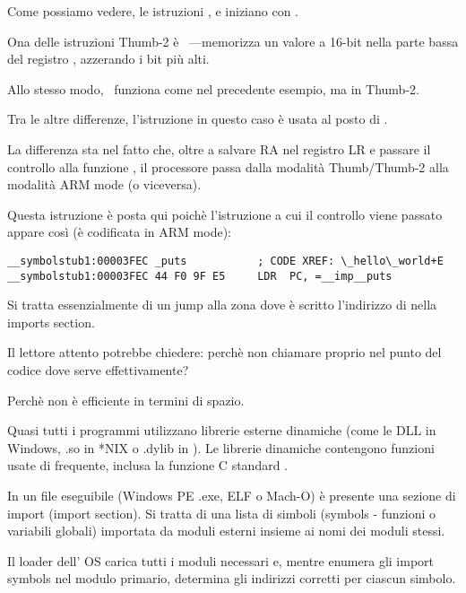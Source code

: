 
Come possiamo vedere, le istruzioni ,  e  iniziano con .

Ona delle istruzioni Thumb-2 è  ~---memorizza un valore a 16-bit nella parte bassa del registro  ,
azzerando i bit più alti.

Allo stesso modo,  ~funziona come  nel precedente esempio, ma in Thumb-2.


Tra le altre differenze, l'istruzione  in questo caso è usata al posto di .

La differenza sta nel fatto che, oltre a salvare \ac{RA} nel registro \ac{LR} e passare il controllo alla funzione \puts,
il processore passa dalla modalità Thumb/Thumb-2 alla modalità ARM mode (o viceversa).

Questa istruzione è posta qui poichè l'istruzione a cui il controllo viene passato appare così (è codificata in ARM mode):

\begin{lstlisting}[style=customasmARM]
__symbolstub1:00003FEC _puts           ; CODE XREF: \_hello\_world+E
__symbolstub1:00003FEC 44 F0 9F E5     LDR  PC, =__imp__puts
\end{lstlisting}

Si tratta essenzialmente di un jump alla zona dove è scritto l'indirizzo di \puts nella imports section.

Il lettore attento potrebbe chiedere: perchè non chiamare \puts proprio nel punto del codice dove serve effettivamente?

Perchè non è efficiente in termini di spazio.

Quasi tutti i programmi utilizzano librerie esterne dinamiche (come le DLL in Windows, .so in *NIX o .dylib in \MacOSX).
Le librerie dinamiche contengono funzioni usate di frequente, inclusa la funzione C standard \puts.

In un file eseguibile (Windows PE .exe, ELF o Mach-O) è presente una sezione di import (import section).
Si tratta di una lista di simboli (symbols - funzioni o variabili globali) importata da moduli esterni insieme ai nomi dei moduli stessi.

Il loader dell' \ac{OS} carica tutti i moduli necessari e, mentre enumera gli import symbols nel modulo primario, determina gli indirizzi
corretti per ciascun simbolo.

